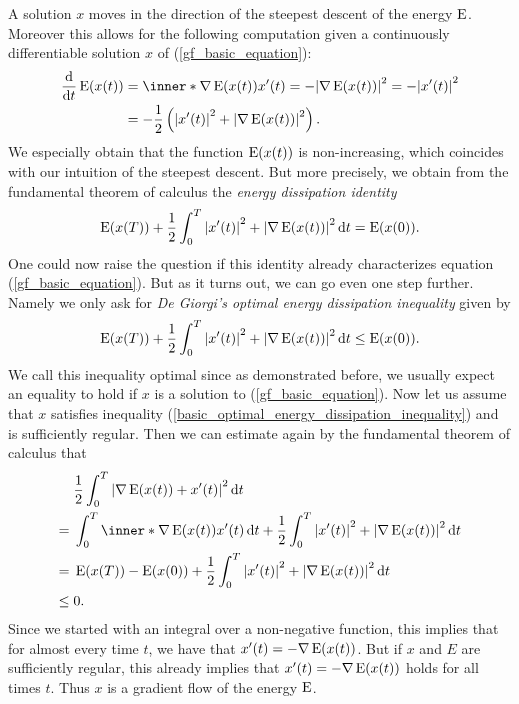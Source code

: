 A solution $ x $ moves in the 
direction of the steepest descent of the energy $ \operatorname{E} $. Moreover this 
allows for the following computation given a continuously differentiable 
solution $ x $ of (\ref{gf_basic_equation}):
\begin{align*}
	\dv{ t } \energy ( x ( t ) ) 
	& =
	\inner*{ \nabla \energy ( x ( t ) ) }{ x ' ( t ) }
	=
	- \abs{ \nabla \energy ( x ( t ) ) }^{ 2 }
	=
	- \abs{ x' ( t ) }^{ 2 }
	\\
	& =
	- \frac{ 1 }{ 2 }
	\left(
		\abs{ x'( t ) }^{ 2 }
		+
		\abs{ \nabla \energy ( x ( t ) ) }^{ 2 }
	\right).
\end{align*}
We especially obtain that the function $ \operatorname{E} ( x ( t ) ) $ is 
non-increasing, which coincides with our intuition of the steepest descent. But 
more precisely, we obtain from the 
fundamental theorem of calculus the \emph{energy dissipation identity}
\begin{equation}
	\label{basic_energy_dissipation_identity}
	\operatorname{E} ( x ( T ) )
	+
	\frac{ 1 }{ 2 }
	\int_{ 0 }^{ T }
		\abs{ x' ( t ) }^{ 2 }
		+
		\abs{ \nabla \operatorname{E} ( x ( t ) ) }^{ 2 }
	\dd{ t }
	= 
	\operatorname{E} ( x ( 0 ) ).
\end{equation}
One could now raise the question if this identity already characterizes 
equation (\ref{gf_basic_equation}). 
But as it turns out, we can go even one step further. Namely we only ask for 
\emph{De Giorgi's optimal energy dissipation inequality} given by
\begin{equation}
	\label{basic_optimal_energy_dissipation_inequality}
	\operatorname{E} ( x ( T ) )
	+
	\frac{ 1 }{ 2 }
	\int_{ 0 }^{ T }
		\abs{ x' ( t ) }^{ 2 }
		+
		\abs{ \nabla \operatorname{E} ( x ( t ) ) }^{ 2 }
	\dd{ t }
	\leq
	\operatorname{E} ( x ( 0 ) ).
\end{equation}
We call this inequality optimal since as demonstrated before, we usually expect 
an equality to hold if $ x $ is a solution to (\ref{gf_basic_equation}).
Now let us assume that $ x $ satisfies inequality
(\ref{basic_optimal_energy_dissipation_inequality}) and is sufficiently regular.
Then we can estimate again by the fundamental theorem of calculus that
\begin{align*}
	& \frac{ 1 }{ 2 }
	\int_{ 0 }^{ T }
		\abs{
			\nabla \energy ( x ( t ) )
			+
			x' ( t ) 
		}^{ 2 }
	\dd{ t }
	\\
	={} &
	\int_{ 0 }^{ T }
		\inner*{ \nabla \energy ( x ( t ) ) }{ x' ( t ) }
	\dd{ t }
	+
	\frac{ 1 }{ 2 }
	\int_{ 0 }^{ T }
		\abs{ x' ( t ) }^{ 2 }
		+
		\abs{ \nabla \energy ( x ( t ) ) }^{ 2 }
	\dd{ t }
	\\
	={} &
	\energy ( x ( T ) ) - \energy ( x ( 0 ) ) 
	+
	\frac{ 1 }{ 2 }
	\int_{ 0 }^{ T }
		\abs{ x' ( t ) }^{ 2 }
		+
		\abs{ \nabla \energy ( x ( t ) ) }^{ 2 }
	\dd{ t }
	\\
	\leq{} & 0.
\end{align*}
Since we started with an integral over a non-negative function, this implies 
that for almost every time $ t $, we have that $ x' ( t ) = - \nabla \operatorname{E} ( 
x ( t ) ) $. But if $ x $ and $ E $ are sufficiently regular, this already 
implies that $ x' ( t ) = - \nabla \operatorname{E} ( x ( t ) ) $ holds for all times $ 
t 
$.
Thus $ x $ is a gradient flow of 
the energy $ \operatorname{E} $.

